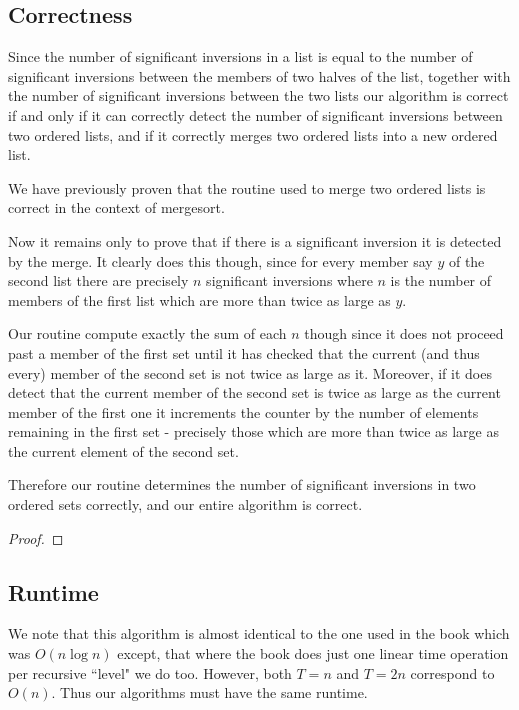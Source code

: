\documentclass{article}
\begin{document}
\subsection{Correctness}
Since the number of significant inversions in a list is equal to the number of significant inversions between the members of two halves of the list, together with the number of significant inversions between the two lists our algorithm is correct if and only if it can correctly detect the number of significant inversions between two ordered lists, and if it correctly merges two ordered lists into a new ordered list.

We have previously proven that the routine used to merge two ordered lists is correct in the context of mergesort. 

Now it remains only to prove that if there is a significant inversion it is detected by the merge. It clearly does this though, since for every member say $y$ of the second list there are precisely $n$ significant inversions where $n$ is the number of members of the first list which are more than twice as large as $y$. 

Our routine compute exactly the sum of each $n$ though since it does not proceed past a member of the first set until it has checked that the current (and thus every) member of the second set is not twice as large as it. Moreover, if it does detect that the current member of the second set is twice as large as the current member of the first one it increments the counter by the number of elements remaining in the first set - precisely those which are more than twice as large as the current element of the second set.

Therefore our routine determines the number of significant inversions in two ordered sets correctly, and our entire algorithm is correct.

\begin{proof}

\end{proof}


\subsection{Runtime}
We note that this algorithm is almost identical to the one used in the book which was $O(n \log{n})$ except, that where the book does just one linear time operation per recursive ``level" we do too. However, both $T= n$ and $T= 2 n$ correspond  to $O(n)$. Thus our algorithms must have the same runtime.
\end{document}
